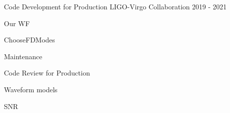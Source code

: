 \begin{cventries}
    \cventry
    {Code Development for Production}
    {LIGO-Virgo Collaboration}
    {2019 - 2021}
    {}
    {
        \begin{cvitems}
            \item{Our WF}
            \item{ChooseFDModes}
            \item{Maintenance}
        \end{cvitems}
    }
    \cventry
    {Code Review for Production}
    {}
    {}
    {}
    {
        \begin{cvitems}
            \item{Waveform models}
            \item{SNR}
        \end{cvitems}
    }
\end{cventries}\vspace{-10pt}


